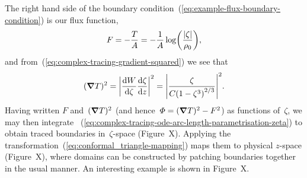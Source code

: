 The right hand side
of the boundary condition~(\ref{eq:example-flux-boundary-condition})
is our flux function,
\begin{equation}
  F = -\frac{T}{A} = -\frac{1}{A} \log \roundbr*{\frac{\abs{\zeta}}{\rho_0}},
  \label{eq:conformal_triangle-flux-function}
\end{equation}
and from~(\ref{eq:complex-tracing-gradient-squared})
we see that
\begin{equation}
  (\del T)^2
    = \abs*{\tder{W}{\zeta} \tder{\zeta}{z}}^2
    = \abs*{\frac{\zeta}{C \roundbr*{1 - \zeta^3}^{2/3}}}^2.
  \label{eq:conformal_triangle-gradient-squared}
\end{equation}
Having written $F$ and~$(\mathop{}\!\boldsymbol{\mathbf{\nabla}} T)^2$
(and hence~$\varPhi = (\mathop{}\!\boldsymbol{\mathbf{\nabla}} T)^2 - F^2$)
as functions of~$\zeta$,
we may then integrate~%
  (\ref{eq:complex-tracing-ode-arc-length-parametrisation-zeta})
to obtain traced boundaries in~$\zeta$-space
(Figure~X\@). %
Applying the transformation~(\ref{eq:conformal_triangle-mapping})
maps them to physical $z$-space
(Figure~X\@), %
where domains can be constructed
by patching boundaries together in the usual manner.
An interesting example is shown in Figure~X\@. %
